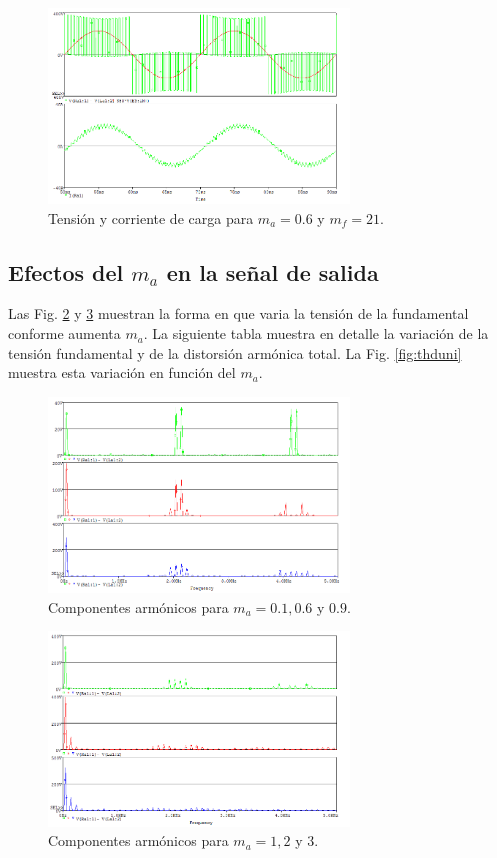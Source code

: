 \documentclass[conference]{IEEEtran}
\begin{document}
\begin{figure}[b]
	\centering
	\includegraphics[width=8cm]{imagenes/unipolar/carga}
	\caption{Tensión y corriente de carga para $m_a = 0.6$ y $m_f = 21$.}
	\label{fig:cargauni}
\end{figure}
\subsection{Efectos del $m_a$ en la señal de salida}
Las Fig. \ref{fig:ma0uni} y \ref{fig:ma1uni} muestran la forma en que varia la tensión de la fundamental conforme aumenta $m_a$. La siguiente tabla muestra en detalle la variación de la tensión fundamental y de la distorsión armónica total. La Fig. \ref{fig:thduni} muestra esta variación en función del $m_a$.
\begin{figure}[t]
	\centering
	\includegraphics[width=8cm]{imagenes/unipolar/ma0}
	\caption{Componentes armónicos para $m_a = 0.1, 0.6$ y $0.9$.}
	\label{fig:ma0uni}
\end{figure}
\begin{figure}[b]
	\centering
	\includegraphics[width=8cm]{imagenes/unipolar/ma1}
	\caption{Componentes armónicos para $m_a = 1, 2$ y $3$.}
	\label{fig:ma1uni}
\end{figure}
\end{document}
